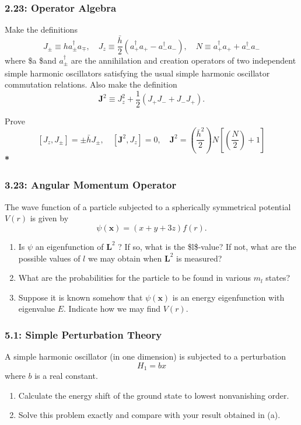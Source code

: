 \documentclass[11pt]{article}
\begin{document}
\subsubsection{2.23: Operator Algebra}
\label{sec:org2326b66}
Make the definitions $$ J_{ \pm} \equiv h a_{ \pm}^{\dagger} a_{\mp}, \quad J_z
\equiv \frac{\bar{h}}{2}\left(a_{+}^{\dagger} a_{+}-a_{-}^{\dagger}
a_{-}\right), \quad N \equiv a_{+}^{\dagger} a_{+}+a_{-}^{\dagger} a_{-} $$
where \$a\textsubscript{ \textpm{}}\$and \(a_{ \pm}^{\dagger}\) are the annihilation and creation
operators of two independent simple harmonic oscillators satisfying the usual
simple harmonic oscillator commutation relations. Also make the definition $$
\mathbf{J}^2 \equiv J_z^2+\frac{1}{2}\left(J_{+} J_{-}+J_{-} J_{+}\right) . $$

Prove $$ \left[J_z, J_{ \pm}\right]= \pm \bar{h} J_{ \pm},
\quad\left[\mathbf{J}^2, J_z\right]=0, \quad
\mathbf{J}^2=\left(\frac{\bar{h}^2}{2}\right)
N\left[\left(\frac{N}{2}\right)+1\right] $$
\textbf{*}
\subsubsection{3.23: Angular Momentum Operator}
\label{sec:org0ec2698}
The wave function of a particle subjected to a spherically symmetrical
potential \(V(r)\) is given by $$ \psi(\mathbf{x})=(x+y+3 z) f(r) . $$
\begin{enumerate}
\item Is \(\psi\) an eigenfunction of \(\mathbf{L}^2\) ? If so, what is the \$l\$-value?
If not, what are the possible values of \(l\) we may obtain when \(\mathbf{L}^2\)
is measured?
\item What are the probabilities for the particle to be found in various \(m_l\)
states?
\item Suppose it is known somehow that \(\psi(\mathbf{x})\) is an energy
eigenfunction with eigenvalue \(E\). Indicate how we may find \(V(r)\).
\end{enumerate}
\subsubsection{5.1: Simple Perturbation Theory}
\label{sec:org11bcd84}
A simple harmonic oscillator (in one dimension) is subjected to a perturbation
$$
H_1=b x
$$
where \(b\) is a real constant.
\begin{enumerate}
\item Calculate the energy shift of the ground state to lowest nonvanishing order.
\item Solve this problem exactly and compare with your result obtained in (a).
\end{enumerate}
\end{document}
